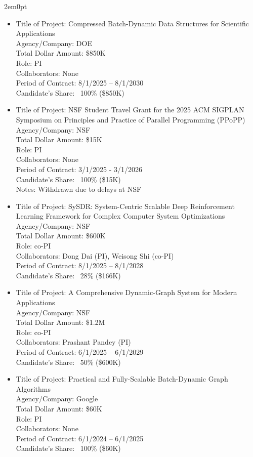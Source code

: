 \begin{adjustwidth}{2em}{0pt}
\begin{itemize}
    \item
    Title of Project: Compressed Batch-Dynamic Data Structures for Scientific Applications \\
    Agency/Company: DOE \\
    Total Dollar Amount: \$850K \\
    Role: PI \\
    Collaborators: None  \\
    Period of Contract: 8/1/2025 – 8/1/2030 \\
    Candidate’s Share: ~100\% (\$850K)
        \item
    Title of Project: NSF Student Travel Grant for the 2025 ACM SIGPLAN Symposium on Principles and Practice of Parallel Programming (PPoPP) \\
    Agency/Company: NSF \\
    Total Dollar Amount: \$15K \\
    Role: PI \\
    Collaborators: None \\
    Period of Contract: 3/1/2025 - 3/1/2026 \\
    Candidate’s Share: ~100\% (\$15K) \\
    Notes: Withdrawn due to delays at NSF
    \item
    Title of Project: SySDR: System-Centric Scalable Deep Reinforcement Learning Framework for Complex Computer System Optimizations \\
    Agency/Company: NSF \\
    Total Dollar Amount: \$600K  \\
    Role: co-PI \\
    Collaborators: Dong Dai (PI), Weisong Shi (co-PI) \\
    Period of Contract: 8/1/2025 – 8/1/2028 \\
    Candidate’s Share: ~28\% (\$166K)
    \item
    Title of Project: A Comprehensive Dynamic-Graph System for Modern
    Applications \\
    Agency/Company: NSF \\
    Total Dollar Amount: \$1.2M \\
    Role: co-PI \\
    Collaborators: Prashant Pandey (PI) \\
    Period of Contract: 6/1/2025 – 6/1/2029 \\
    Candidate’s Share: ~50\% (\$600K)
    \item
    Title of Project: Practical and Fully-Scalable Batch-Dynamic Graph Algorithms \\
    Agency/Company: Google \\
    Total Dollar Amount: \$60K \\
    Role: PI \\
    Collaborators: None \\
    Period of Contract: 6/1/2024 – 6/1/2025 \\
    Candidate’s Share: ~100\% (\$60K)
\end{itemize}
\fi


\end{adjustwidth}
